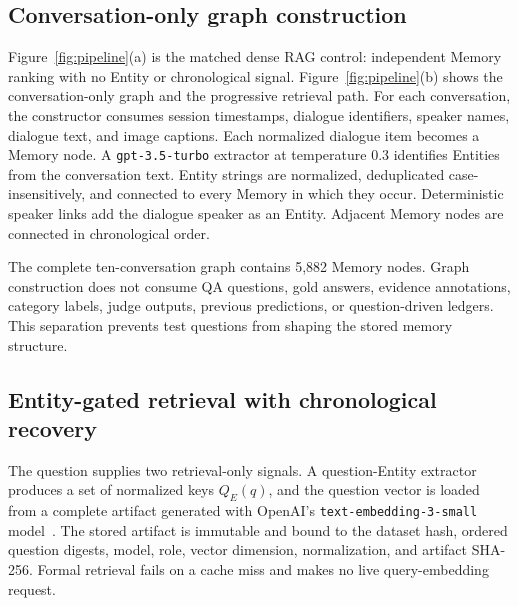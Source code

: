 \documentclass[10pt,twocolumn]{article}
\begin{document}
\subsection{Conversation-only graph construction}

Figure~\ref{fig:pipeline}(a) is the matched dense RAG control: independent
Memory ranking with no Entity or chronological signal.
Figure~\ref{fig:pipeline}(b) shows the conversation-only graph and the
progressive retrieval path. For each
conversation, the constructor consumes session timestamps, dialogue
identifiers, speaker names, dialogue text, and image captions. Each normalized
dialogue item becomes a Memory node. A \texttt{gpt-3.5-turbo} extractor at
temperature 0.3 identifies Entities from the conversation text. Entity strings
are normalized, deduplicated case-insensitively, and connected to every Memory
in which they occur. Deterministic speaker links add the dialogue speaker as an
Entity. Adjacent Memory nodes are connected in chronological order.

The complete ten-conversation graph contains 5,882 Memory nodes. Graph
construction does not consume QA questions, gold answers, evidence
annotations, category labels, judge outputs, previous predictions, or
question-driven ledgers. This separation prevents test questions from shaping
the stored memory structure.

\subsection{Entity-gated retrieval with chronological recovery}

The question supplies two retrieval-only signals. A question-Entity extractor
produces a set of normalized keys \(Q_E(q)\), and the question vector is loaded
from a complete artifact generated with OpenAI's
\texttt{text-embedding-3-small} model~\citep{openaiTextEmbedding3Small}. The
stored artifact is immutable and bound to the dataset hash, ordered question
digests, model, role, vector dimension, normalization, and artifact SHA-256.
Formal retrieval fails on a cache miss and makes no live query-embedding
request.
\end{document}
